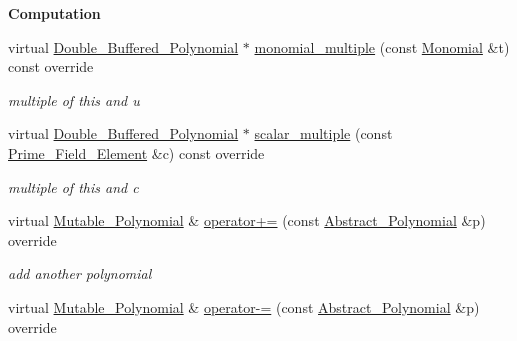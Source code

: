 \begin{Indent}\textbf{ Computation}\par
\begin{DoxyCompactItemize}
\item 
\mbox{\label{group__polygroup_af210793e13c89388c3704d27bbf96516}} 
virtual \hyperlink{group__polygroup_class_double___buffered___polynomial}{Double\+\_\+\+Buffered\+\_\+\+Polynomial} $\ast$ \hyperlink{group__polygroup_af210793e13c89388c3704d27bbf96516}{monomial\+\_\+multiple} (const \hyperlink{group__polygroup_class_monomial}{Monomial} \&t) const override
\begin{DoxyCompactList}\small\item\em multiple of this and u \end{DoxyCompactList}\item 
\mbox{\label{group__polygroup_a7d434fba3c5a5f8eb1c6ebd2dfd24eac}} 
virtual \hyperlink{group__polygroup_class_double___buffered___polynomial}{Double\+\_\+\+Buffered\+\_\+\+Polynomial} $\ast$ \hyperlink{group__polygroup_a7d434fba3c5a5f8eb1c6ebd2dfd24eac}{scalar\+\_\+multiple} (const \hyperlink{group___fields_group_class_prime___field___element}{Prime\+\_\+\+Field\+\_\+\+Element} \&c) const override
\begin{DoxyCompactList}\small\item\em multiple of this and c \end{DoxyCompactList}\item 
\mbox{\label{group__polygroup_ad30266ecf9eb2845b29a673e30d33b77}} 
virtual \hyperlink{group__polygroup_class_mutable___polynomial}{Mutable\+\_\+\+Polynomial} \& \hyperlink{group__polygroup_ad30266ecf9eb2845b29a673e30d33b77}{operator+=} (const \hyperlink{group__polygroup_class_abstract___polynomial}{Abstract\+\_\+\+Polynomial} \&p) override
\begin{DoxyCompactList}\small\item\em add another polynomial \end{DoxyCompactList}\item 
\mbox{\label{group__polygroup_ac8c06c72eb6242460aeb00810abb0d2d}} 
virtual \hyperlink{group__polygroup_class_mutable___polynomial}{Mutable\+\_\+\+Polynomial} \& \hyperlink{group__polygroup_ac8c06c72eb6242460aeb00810abb0d2d}{operator-\/=} (const \hyperlink{group__polygroup_class_abstract___polynomial}{Abstract\+\_\+\+Polynomial} \&p) override

\end{DoxyCompactItemize}
\end{Indent}
